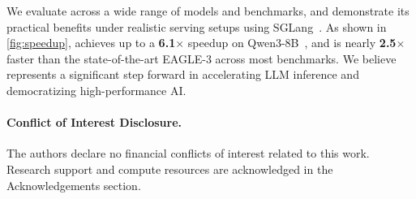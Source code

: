 We evaluate \method across a wide range of models and benchmarks, and demonstrate its practical benefits under realistic serving setups using SGLang~\cite{zheng2024sglangefficientexecutionstructured}. As shown in \autoref{fig:speedup}, \method achieves up to a \textbf{6.1$\boldsymbol{\times}$} speedup on Qwen3-8B~\citep{yang2025qwen3technicalreport}, and is nearly \textbf{2.5$\boldsymbol{\times}$} faster than the state-of-the-art EAGLE-3 across most benchmarks. We believe \method represents a significant step forward in accelerating LLM inference and democratizing high-performance AI.

\paragraph{Conflict of Interest Disclosure.}
The authors declare no financial conflicts of interest related to this work. Research support and compute resources are acknowledged in the Acknowledgements section.

